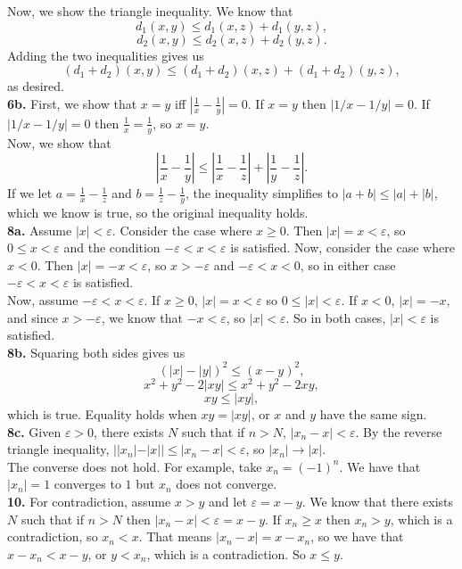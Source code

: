 \documentclass{article}
\newcommand{\eps}{\varepsilon}
\begin{document}
Now, we show the triangle inequality. We know that
$$d_1(x, y) \le d_1(x, z) + d_1(y, z),$$
$$d_2(x, y) \le d_2(x, z) + d_2(y, z).$$
Adding the two inequalities gives us
$$(d_1 + d_2)(x, y) \le (d_1 + d_2)(x, z) + (d_1 + d_2)(y, z),$$
as desired. \\

\textbf{6b.} First, we show that $x = y$ iff $\left|\frac{1}{x} - \frac{1}{y}\right| = 0$. If $x = y$ then $|1/x - 1/y| = 0$. If $|1/x - 1/y| = 0$ then $\frac{1}{x} = \frac{1}{y}$, so $x = y$. \\

Now, we show that
$$\left|\frac{1}{x} - \frac{1}{y}\right| \le \left|\frac{1}{x} - \frac{1}{z}\right| + \left|\frac{1}{y} - \frac{1}{z}\right|.$$
If we let $a = \frac{1}{x} - \frac{1}{z}$ and $b = \frac{1}{z} - \frac{1}{y}$, the inequality simplifies to $|a + b| \le |a| + |b|$, which we know is true, so the original inequality holds. \\

\textbf{8a.} Assume $|x| < \eps$. Consider the case where $x \ge 0$. Then $|x| = x < \eps$, so $0 \le x < \eps$ and the condition $-\eps < x < \eps$ is satisfied. Now, consider the case where $x < 0$. Then $|x| = -x < \eps$, so $x > -\eps$ and $-\eps < x < 0$, so in either case $-\eps < x < \eps$ is satisfied. \\

Now, assume $-\eps < x < \eps$. If $x \ge 0$, $|x| = x < \eps$ so $0 \le |x| < \eps$. If $x < 0$, $|x| = -x$, and since $x > -\eps$, we know that $-x < \eps$, so $|x| < \eps$. So in both cases, $|x| < \eps$ is satisfied. \\

\textbf{8b.} Squaring both sides gives us
$$(|x| - |y|)^2 \le (x - y)^2,$$
$$x^2 + y^2 - 2|xy| \le x^2 + y^2 - 2xy,$$
$$xy \le |xy|,$$
which is true. Equality holds when $xy = |xy|$, or $x$ and $y$ have the same sign. \\

\textbf{8c.} Given $\eps > 0$, there exists $N$ such that if $n > N$, $|x_n - x| < \eps$. By the reverse triangle inequality, $||x_n| - |x|| \le |x_n - x| < \eps$, so $|x_n| \to |x|$. \\

The converse does not hold. For example, take $x_n = (-1)^n$. We have that $|x_n| = 1$ converges to $1$ but $x_n$ does not converge. \\

\textbf{10.} For contradiction, assume $x > y$ and let $\eps = x - y$. We know that there exists $N$ such that if $n > N$ then $|x_n - x| < \eps = x - y$. If $x_n \ge x$ then $x_n > y$, which is a contradiction, so $x_n < x$. That means $|x_n - x| = x - x_n$, so we have that $x - x_n < x - y$, or $y < x_n$, which is a contradiction. So $x \le y$. \\
\end{document}
